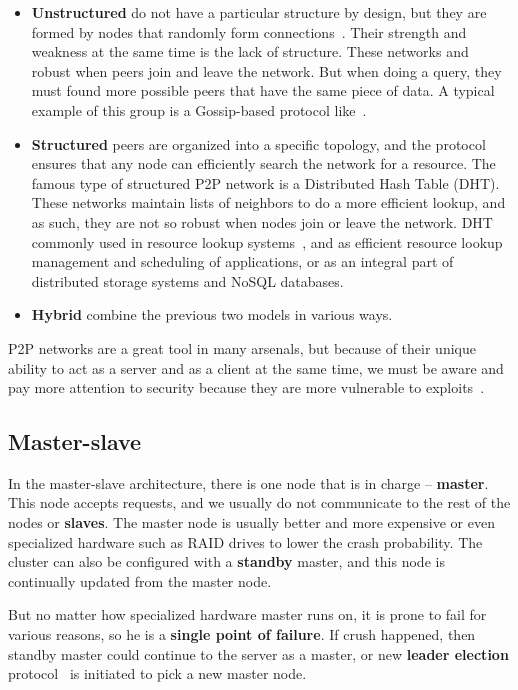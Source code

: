 \begin{itemize}
	\item \textbf{Unstructured} do not have a particular structure by design, but they are formed by nodes that randomly form connections~\cite{FilaliBHB11}. Their strength and weakness at the same time is the lack of structure. These networks and robust when peers join and leave the network. But when doing a query, they must found more possible peers that have the same piece of data. A typical example of this group is a Gossip-based protocol like~\cite{DasGM02}.
	\item \textbf{Structured} peers are organized into a specific topology, and the protocol ensures that any node can efficiently search the network for a resource. The famous type of structured P2P network is a Distributed Hash Table (DHT). These networks maintain lists of neighbors to do a more efficient lookup, and as such, they are not so robust when nodes join or leave the network. DHT commonly used in resource lookup systems~\cite{StoicaMKKB01}, and as efficient resource lookup management and scheduling of applications, or as an integral part of distributed storage systems and NoSQL\cite{Leavitt10} databases.
	\item \textbf{Hybrid} combine the previous two models in various ways.
\end{itemize}

\noindent
P2P networks are a great tool in many arsenals, but because of their unique ability to act as a server and as a client at the same time, we must be aware and pay more attention to security because they are more vulnerable to exploits~\cite{0024003}.
%
%
\subsection{Master-slave}\label{sec:master_slave}
%
In the master-slave architecture, there is one node that is in charge -- \textbf{master}. This node accepts requests, and we usually do not communicate to the rest of the nodes or \textbf{slaves}. The master node is usually better and more expensive or even specialized hardware such as RAID drives to lower the crash probability. The cluster can also be configured with a \textbf{standby} master, and this node is continually updated from the master node.

But no matter how specialized hardware master runs on, it is prone to fail for various reasons, so he is a \textbf{single point of failure}. If crush happened, then standby master could continue to the server as a master, or new \textbf{leader election} protocol~\cite{KorachKM90} is initiated to pick a new master node. 

